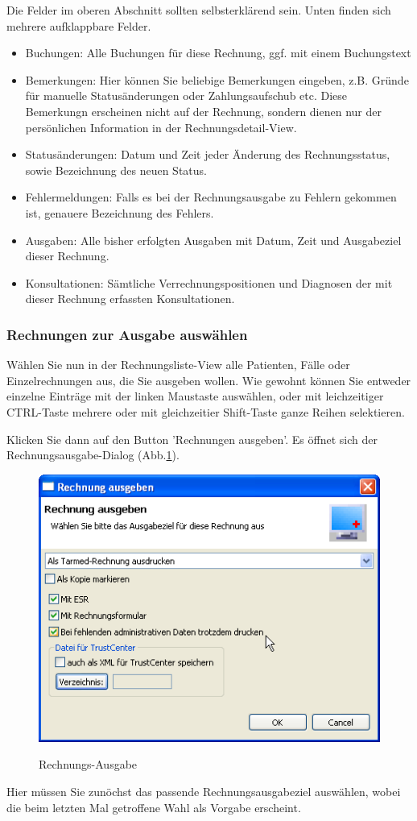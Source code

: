 \documentclass[a4paper]{scrartcl}
\begin{document}
Die Felder im oberen Abschnitt sollten selbsterklärend sein. Unten finden sich mehrere aufklappbare Felder.
\begin{itemize}
\item Buchungen: Alle Buchungen für diese Rechnung, ggf. mit einem Buchungstext
\item Bemerkungen: Hier können Sie beliebige Bemerkungen eingeben, z.B. Gründe für manuelle Statusänderungen oder Zahlungsaufschub etc. Diese Bemerkungn erscheinen nicht auf der Rechnung, sondern dienen nur der persönlichen Information in der Rechnungsdetail-View.
\item Statusänderungen: Datum und Zeit jeder Änderung des Rechnungsstatus, sowie Bezeichnung des neuen Status.
\item Fehlermeldungen: Falls es bei der Rechnungsausgabe zu Fehlern gekommen ist, genauere Bezeichnung des Fehlers.
\item Ausgaben: Alle bisher erfolgten Ausgaben mit Datum, Zeit und Ausgabeziel dieser Rechnung.
\item Konsultationen: Sämtliche Verrechnungspositionen und Diagnosen der mit dieser Rechnung erfassten Konsultationen.
\end{itemize}

\subsubsection{Rechnungen zur Ausgabe auswählen}
Wählen Sie nun in der Rechnungsliste-View alle Patienten, Fälle oder Einzelrechnungen aus, die Sie ausgeben wollen. Wie gewohnt können Sie entweder einzelne Einträge mit der linken Maustaste auswählen, oder mit leichzeitiger CTRL-Taste mehrere oder mit gleichzeitier Shift-Taste ganze Reihen selektieren. 

\medskip

Klicken Sie dann auf den Button 'Rechnungen ausgeben'. Es öffnet sich der Rechnungsausgabe-Dialog (Abb.\ref{fig:abr14}).
\begin{figure}
  \includegraphics{abr14}\\
  \caption{Rechnungs-Ausgabe}\label{fig:abr14}
\end{figure}
Hier müssen Sie zunöchst das passende Rechnungsausgabeziel auswählen, wobei die beim letzten Mal getroffene Wahl als Vorgabe erscheint.
\end{document}
